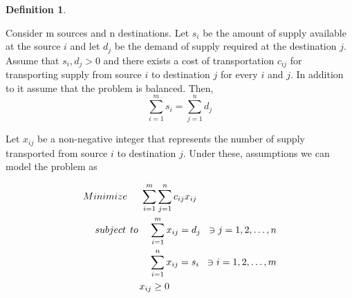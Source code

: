 \documentclass[12pt]{article}
\theoremstyle{definition}
\newtheorem{definition}{Definition}
\theoremstyle{definition}
\numberwithin{equation}{section}
\begin{document}
\begin{definition}\label{def:1}
 
 Consider m sources and n destinations. Let $s_{i}$ be the amount of supply available at the source $i$ and let $d_{j}$ be the demand of supply required at the destination $j$. Assume that $s_{i}, d_{j}>0$ and there exists a cost of transportation $c_{ij}$ for transporting supply from source $i$ to destination $j$ for every $i$ and $j$. In addition to it assume that the problem is balanced. Then,
 \begin{equation}
 \sum_{i=1}^{m}s_{i}= \sum_{j=1}^{n}d_{j}
 \end{equation}
 
 Let $x_{ij}$  be a non-negative integer that represents the number of supply transported from source $i$ to destination $j$. Under these, assumptions we can model the problem as
 
 \begin{equation}
 \begin{aligned}
  Minimize \hspace{5mm} \sum_{i=1}^{m}\sum_{j=1}^{n} c_{ij}x_{ij} \hspace{29mm}\\ \vspace{4mm}
 subject \hspace{1.5mm}to \hspace{4mm} \sum_{i=1}^{m} x_{ij} = d_{j} \hspace{2mm}\ni j=1,2,\dotsc,n\\ \vspace{1mm}
 \sum_{i=1}^{n} x_{ij} = s_{i} \hspace{2mm}\ni i=1,2,\dotsc,m\\ \vspace{2mm}
 x_{ij} \geq 0 \hspace{39mm}
 \end{aligned}
 \end{equation}
 \end{definition}
 
\end{document}
